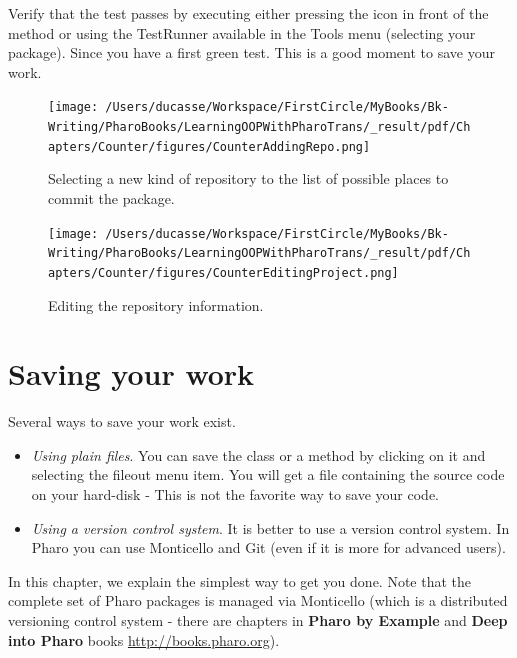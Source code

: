 \documentclass[10pt,twoside,english]{_support/latex/sbabook/sbabook}
\begin{document}
Verify that the test passes by executing either pressing the icon in front of the method or using the TestRunner available in the Tools menu (selecting your package).
Since you have a first green test. This is a good moment to save your work. 


\begin{figure}

\begin{center}
\texttt{[image: /Users/ducasse/Workspace/FirstCircle/MyBooks/Bk-Writing/PharoBooks/LearningOOPWithPharoTrans/\_result/pdf/Chapters/Counter/figures/CounterAddingRepo.png]}\caption{Selecting a new kind of repository to the list of possible places to commit the package.\label{figSelectingARepo}}\end{center}
\end{figure}



\begin{figure}

\begin{center}
\texttt{[image: /Users/ducasse/Workspace/FirstCircle/MyBooks/Bk-Writing/PharoBooks/LearningOOPWithPharoTrans/\_result/pdf/Chapters/Counter/figures/CounterEditingProject.png]}\caption{Editing the repository information.\label{figAddingARepo}}\end{center}
\end{figure}

\section{Saving your work}
Several ways to save your work exist. 

\begin{itemize}
\item \textit{Using plain files}. You can save the class or a method by clicking on it and selecting the fileout menu item. You will get a file containing the source code on your hard-disk - This is not the favorite way to save your code. 
\item \textit{Using a version control system}. It is better to use a version control system. In Pharo you can use Monticello and Git (even if it is more for advanced users).
\end{itemize}

In this chapter, we explain the simplest way to get you done. Note that the complete set of Pharo packages is managed via Monticello (which is a distributed versioning control system - there are chapters in \textbf{Pharo by Example} and \textbf{Deep into Pharo} books \url{http://books.pharo.org}).
\end{document}
